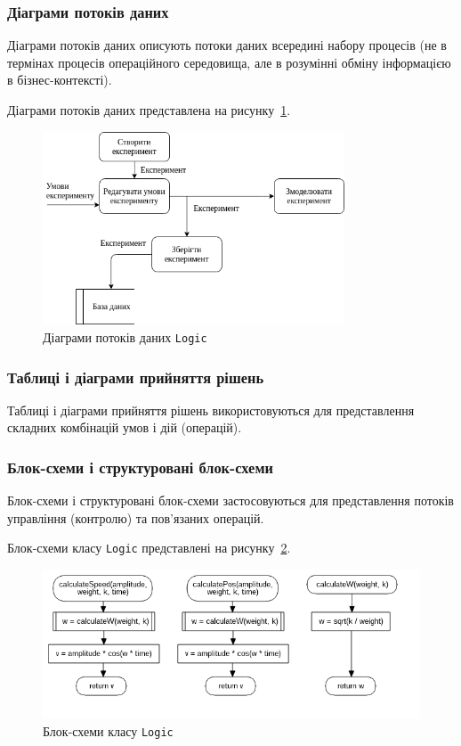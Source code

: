 \subsubsection{Діаграми потоків даних}
Діаграми потоків даних описують потоки даних всередині набору процесів (не в термінах процесів операційного середовища, але в розумінні обміну інформацією в бізнес-контексті).

Діаграми потоків даних представлена на рисунку~\ref{fig:dfd}.

\begin{figure}[H]
  \centering
    \includegraphics[width=0.8\textwidth]{dfd}
  \caption{Діаграми потоків даних \texttt{Logic}}
  \label{fig:dfd}
\end{figure}

\subsubsection{Таблиці і діаграми прийняття рішень}
Таблиці і діаграми прийняття рішень використовуються для представлення складних комбінацій умов і дій (операцій).

\subsubsection{Блок-схеми і структуровані блок-схеми}
Блок-схеми і структуровані блок-схеми застосовуються для представлення потоків управління (контролю) та пов'язаних операцій.

Блок-схеми класу \texttt{Logic} представлені на рисунку~\ref{fig:uml_flowchart_logic}.

\begin{figure}[H]
  \centering
    \includegraphics[width=1\textwidth]{uml_flowchart_logic}
  \caption{Блок-схеми класу \texttt{Logic}}
  \label{fig:uml_flowchart_logic}
\end{figure}

